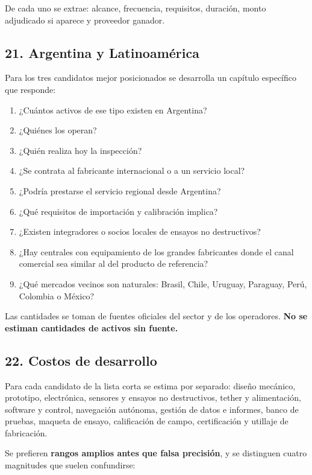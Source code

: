 \documentclass[11pt,a4paper]{article}
\begin{document}
De cada uno se extrae: alcance, frecuencia, requisitos, duración, monto adjudicado si aparece y proveedor ganador.


\subsection*{21. Argentina y Latinoamérica}

Para los tres candidatos mejor posicionados se desarrolla un capítulo específico que responde:

\begin{enumerate}
\item ¿Cuántos activos de ese tipo existen en Argentina?
\item ¿Quiénes los operan?
\item ¿Quién realiza hoy la inspección?
\item ¿Se contrata al fabricante internacional o a un servicio local?
\item ¿Podría prestarse el servicio regional desde Argentina?
\item ¿Qué requisitos de importación y calibración implica?
\item ¿Existen integradores o socios locales de ensayos no destructivos?
\item ¿Hay centrales con equipamiento de los grandes fabricantes donde el canal comercial sea similar al del producto de referencia?
\item ¿Qué mercados vecinos son naturales: Brasil, Chile, Uruguay, Paraguay, Perú, Colombia o México?
\end{enumerate}

Las cantidades se toman de fuentes oficiales del sector y de los operadores. \textbf{No se estiman cantidades de activos sin fuente.}


\subsection*{22. Costos de desarrollo}

Para cada candidato de la lista corta se estima por separado: diseño mecánico, prototipo, electrónica, sensores y ensayos no destructivos, tether y alimentación, software y control, navegación autónoma, gestión de datos e informes, banco de pruebas, maqueta de ensayo, calificación de campo, certificación y utillaje de fabricación.

Se prefieren \textbf{rangos amplios antes que falsa precisión}, y se distinguen cuatro magnitudes que suelen confundirse:
\end{document}

